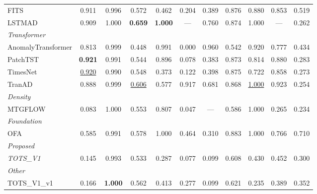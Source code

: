 \begin{table}[t]
\begin{tabular}{lcccccccccc}
FITS & 0.911 & 0.996 & 0.572 & 0.462 & 0.204 & 0.389 & 0.876 & 0.880 & 0.853 & 0.519 \\
LSTMAD & 0.909 & 1.000 & \textbf{0.659} & \textbf{1.000} & --- & 0.760 & 0.874 & 1.000 & --- & 0.262 \\
\midrule
\multicolumn{11}{l}{\textit{Transformer}} \\
AnomalyTransformer & 0.813 & 0.999 & 0.448 & 0.991 & 0.000 & 0.960 & 0.542 & 0.920 & 0.777 & 0.434 \\
PatchTST & \textbf{0.921} & 0.991 & 0.544 & 0.896 & 0.078 & 0.383 & 0.873 & 0.814 & 0.880 & 0.283 \\
TimesNet & \underline{0.920} & 0.990 & 0.548 & 0.373 & 0.122 & 0.398 & 0.875 & 0.722 & 0.858 & 0.273 \\
TranAD & 0.888 & 0.999 & \underline{0.606} & 0.577 & 0.917 & 0.681 & 0.868 & \underline{1.000} & 0.923 & 0.254 \\
\midrule
\multicolumn{11}{l}{\textit{Density}} \\
MTGFLOW & 0.083 & 1.000 & 0.553 & 0.807 & 0.047 & --- & 0.586 & 1.000 & 0.265 & 0.234 \\
\midrule
\multicolumn{11}{l}{\textit{Foundation}} \\
OFA & 0.585 & 0.991 & 0.578 & 1.000 & 0.464 & 0.310 & 0.883 & 1.000 & 0.766 & 0.710 \\
\midrule
\multicolumn{11}{l}{\textit{Proposed}} \\
\textit{TOTS\_V1} & 0.145 & 0.993 & 0.533 & 0.287 & 0.077 & 0.099 & 0.608 & 0.430 & 0.452 & 0.300 \\
\midrule
\multicolumn{11}{l}{\textit{Other}} \\
TOTS\_V1\_v1 & 0.166 & \textbf{1.000} & 0.562 & 0.413 & 0.277 & 0.099 & 0.621 & 0.235 & 0.389 & 0.352 \\
\bottomrule
\end{tabular}
\end{table}
